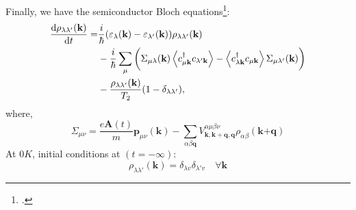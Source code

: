 \documentclass{beamer}
\begin{document}
\begin{frame}
Finally, we have the semiconductor Bloch equations\footcite{haug_quantum_2009}:
\begin{align}
	\dv{\rho_{\lambda\lambda'}(\textbf{k})}{t} = &\frac{i}{\hbar} (\varepsilon_{\lambda}(\textbf{k}) - \varepsilon_{\lambda'}(\textbf{k}))\rho_{\lambda\lambda'}(\textbf{k})\nonumber\\
	&-\frac{i}{\hbar} \sum_{\mu}\bigg(\Sigma_{\mu \lambda}(\textbf{k}) \ev{c^{\dagger}_{\mu\textbf{k}} c_{\lambda'\textbf{k}}} - \ev{c^{\dagger}_{\lambda\textbf{k}} c_{\mu\textbf{k}}} \Sigma_{\mu \lambda'}(\textbf{k})\bigg)\\ &-\frac{\rho_{\lambda\lambda'}(\textbf{k})}{T_2}(1-\delta_{\lambda\lambda'}),\nonumber
\end{align}
where,
\begin{equation}
	\Sigma_{\mu\nu} = \frac{e\textbf{A}(t)}{m}\textbf{p}_{\mu\nu}(\textbf{k}) - \sum_{\alpha\beta\textbf{q}} V^{\alpha \mu \beta \nu}_{\textbf{k},\textbf{k}+\textbf{q},\textbf{q}}\rho_{\alpha \beta}(\textbf{k+q})
\end{equation}
At $0K$, initial conditions at \((t=-\infty)\):
$$\rho_{\lambda\lambda'}(\textbf{k}) = \delta_{\lambda v} \delta_{\lambda' v} \quad \forall \textbf{k}$$
\end{frame}
\end{document}

